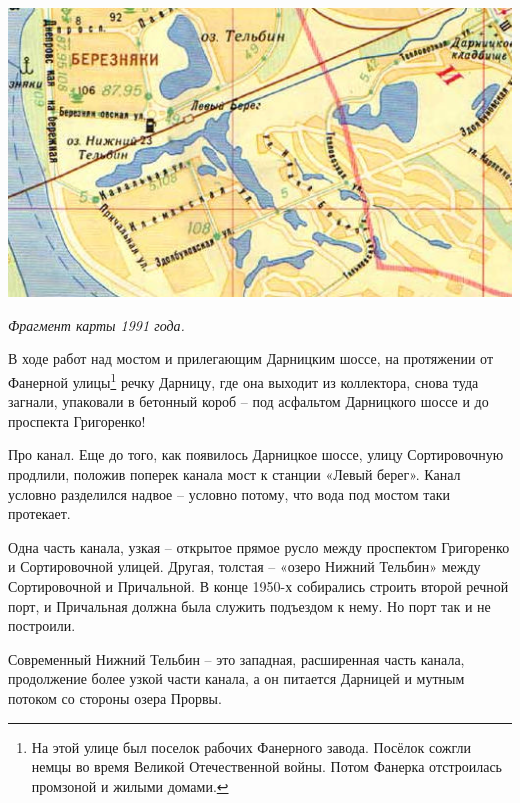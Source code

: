 \begin{center}
\includegraphics[width=\linewidth]{chast-gorodki/terbin/1991-telbin.jpg}

\textit{Фрагмент карты 1991 года.}
\end{center}



В ходе работ над мостом и прилегающим Дарницким шоссе, на протяжении от Фанерной улицы\footnote{На этой улице был поселок рабочих Фанерного завода. Посёлок сожгли немцы во время Великой Отечественной войны. Потом Фанерка отстроилась промзоной и жилыми домами.} речку Дарницу, где она выходит из коллектора, снова туда загнали, упаковали в бетонный короб – под асфальтом Дарницкого шоссе и до проспекта Григоренко!

Про канал. Еще до того, как появилось Дарницкое шоссе, улицу Сортировочную продлили, положив поперек канала мост к станции «Левый берег». Канал условно разделился надвое – условно потому, что вода под мостом таки протекает. 

Одна часть канала, узкая – открытое прямое русло между проспектом Григоренко и Сортировочной улицей. Другая, толстая – «озеро Нижний Тельбин» между Сортировочной и Причальной. В конце 1950-х собирались строить второй речной порт, и Причальная должна была служить подъездом к нему. Но порт так и не построили.

Современный Нижний Тельбин – это западная, расширенная часть канала, продолжение более узкой части канала, а он питается Дарницей и мутным потоком со стороны озера Прорвы.
 
